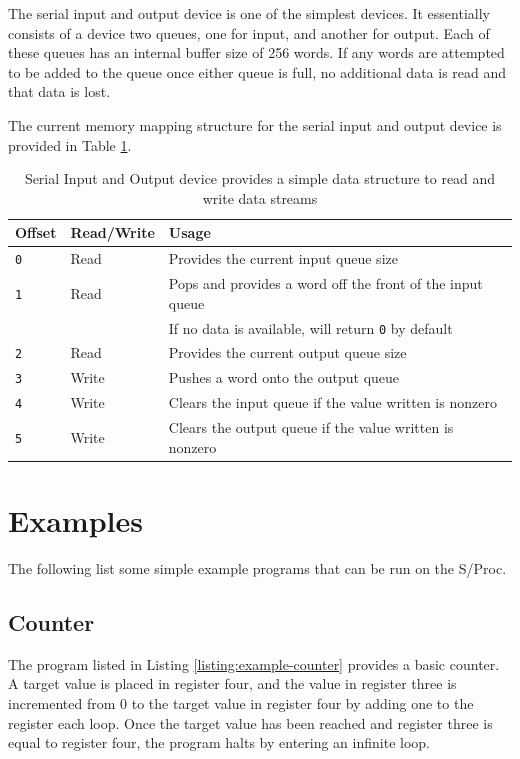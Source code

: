 \documentclass{article}
\begin{document}
The serial input and output device is one of the simplest devices. It essentially consists of a device two queues, one for input, and another for output. Each of these queues has an internal buffer size of 256 words. If any words are attempted to be added to the queue once either queue is full, no additional data is read and that data is lost.

The current memory mapping structure for the serial input and output device is provided in Table \ref{table:dev-serial-io}.

\begin{table}[h!]
	\centering
	\begin{tabular}{l|ll}
		\hline
		Offset & Read/Write & Usage \\
		\hline
		\texttt{0} & Read & Provides the current input queue size \\
		\texttt{1} & Read & Pops and provides a word off the front of the input queue \\
		& & If no data is available, will return \texttt{0} by default \\
		\texttt{2} & Read & Provides the current output queue size \\
		\texttt{3} & Write & Pushes a word onto the output queue \\
		\texttt{4} & Write & Clears the input queue if the value written is nonzero \\
		\texttt{5} & Write & Clears the output queue if the value written is nonzero \\
		\hline
	\end{tabular}
	\caption{Serial Input and Output device provides a simple data structure to read and write data streams}
	\label{table:dev-serial-io}
\end{table}

\pagebreak

\section{Examples}

The following list some simple example programs that can be run on the S/Proc.

\subsection{Counter}

The program listed in Listing \ref{listing:example-counter} provides a basic counter. A target value is placed in register four, and the value in register three is incremented from 0 to the target value in register four by adding one to the register each loop. Once the target value has been reached and register three is equal to register four, the program halts by entering an infinite loop.
\end{document}
